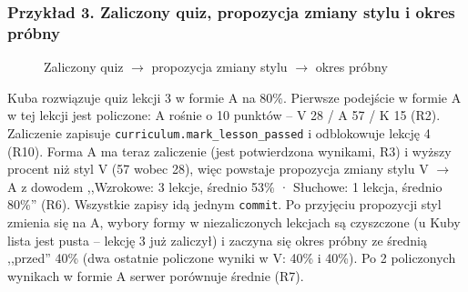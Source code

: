\subsubsection{Przykład 3. Zaliczony quiz, propozycja zmiany stylu i okres próbny}

\begin{figure}[H]
    \centering
    
    \caption{Zaliczony quiz $\to$ propozycja zmiany stylu $\to$ okres próbny}
\end{figure}

Kuba rozwiązuje quiz lekcji 3 w formie A na 80\%. Pierwsze podejście w formie A w tej lekcji jest policzone: A rośnie o 10 punktów -- V 28 / A 57 / K 15 (R2). Zaliczenie zapisuje \texttt{curriculum.mark\_lesson\_passed} i odblokowuje lekcję 4 (R10). Forma A ma teraz zaliczenie (jest potwierdzona wynikami, R3) i wyższy procent niż styl V (57 wobec 28), więc powstaje propozycja zmiany stylu V $\to$ A z dowodem ,,Wzrokowe: 3 lekcje, średnio 53\% · Słuchowe: 1 lekcja, średnio 80\%'' (R6). Wszystkie zapisy idą jednym \texttt{commit}. Po przyjęciu propozycji styl zmienia się na A, wybory formy w niezaliczonych lekcjach są czyszczone (u Kuby lista jest pusta -- lekcję 3 już zaliczył) i zaczyna się okres próbny ze średnią ,,przed'' 40\% (dwa ostatnie policzone wyniki w V: 40\% i 40\%). Po 2 policzonych wynikach w formie A serwer porównuje średnie (R7).
